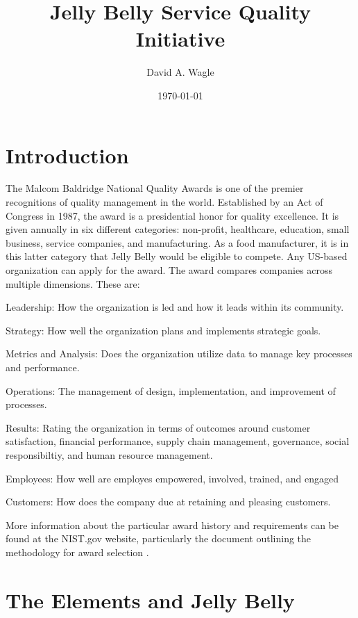 \documentclass[man]{apa7}
\affiliation{North Central University}
\author{David A. Wagle}
\date{\today}
\title{Jelly Belly Service Quality Initiative}
\begin{document}
\maketitle


\section{Introduction}
\label{sec:org27e5d68}

The Malcom Baldridge National Quality Awards is one of the premier recognitions of quality management in the world. Established by an Act of Congress in 1987, the award is a presidential honor for quality excellence. It is given annually in six different categories: non-profit, healthcare, education, small business, service companies, and manufacturing. As a food manufacturer, it is in this latter category that Jelly Belly would be eligible to compete. Any US-based organization can apply for the award. The award compares companies across multiple dimensions. These are:


\begin{APAitemize}
\item Leadership: How the organization is led and how it leads within its community.
\item Strategy: How well the organization plans and implements strategic goals.
\item Metrics and Analysis: Does the organization utilize data to manage key processes and performance.
\item Operations: The management of design, implementation, and improvement of processes.
\item Results: Rating the organization in terms of outcomes around customer satisfaction, financial performance, supply chain management, governance, social responsibiltiy, and human resource management.
\item Employees: How well are employes empowered, involved, trained, and engaged
\item Customers: How does the company due at retaining and pleasing customers.
\end{APAitemize}

More information about the particular award history and requirements can be found at the NIST.gov website, particularly the document outlining the methodology for award selection \parencite{ nationalinstituteofstandardsandtechnologyBaldrigePerformanceExcellence2015} .

\section{The Elements and Jelly Belly}
\label{sec:org8e9f907}
\end{document}
